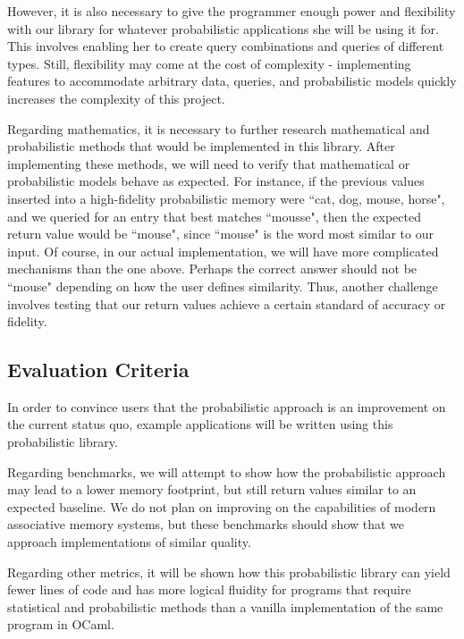 \documentclass{sig-alternate}
\begin{document}
However, it is also necessary to give the programmer enough power and flexibility with our library for 
whatever probabilistic applications she will be using it for. This involves enabling 
her to create query combinations and queries of different types. Still, flexibility may 
come at the cost of complexity - implementing features to accommodate arbitrary data, queries,
and probabilistic models quickly increases the complexity of this project. 

Regarding mathematics, it is necessary to further research mathematical 
and probabilistic methods that would be implemented in this library. After implementing these methods,
we will need to verify that mathematical or probabilistic models behave as expected. 
For instance, if the previous values inserted into a high-fidelity probabilistic memory were ``cat, dog, mouse, horse", and we queried for an entry that best
matches ``mousse", 
then the expected return value would be ``mouse", since ``mouse" is the word most
similar to our input. 
Of course, in our actual implementation, we will have more complicated mechanisms than the one above. Perhaps the correct answer should not be ``mouse" depending
on how the user defines similarity. 
Thus, another challenge involves testing that our return values achieve a certain standard of accuracy or fidelity.

\subsection{Evaluation Criteria}
\label{subsec:eval_criteria}
In order to convince users that the probabilistic approach is an improvement on the
current status quo, example applications will be written using this probabilistic library. 


Regarding benchmarks, we will attempt to show how the probabilistic approach may lead to 
a lower memory footprint, but still return values similar to an expected baseline.
We do not plan on improving on the capabilities of modern associative memory
systems, but these benchmarks should show that we approach implementations of similar
quality. 

Regarding other metrics, it will be shown how this probabilistic library can yield 
fewer lines of code and has more logical fluidity for programs that require statistical 
and probabilistic methods than a vanilla implementation of the same program in OCaml. 
\end{document}
